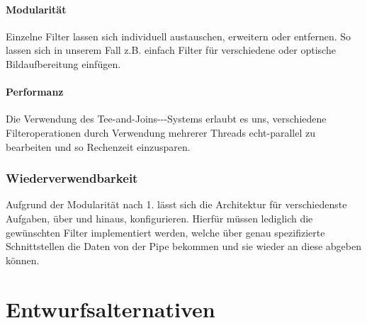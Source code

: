 \documentclass[12pt,a4paper,ngerman,enabledeprecatedfontcommands]{scrreprt}
\begin{document}
\subsubsection{Modularität}
Einzelne \gls{Filter} lassen sich individuell austauschen, erweitern oder entfernen. So lassen sich in unserem Fall z.B. einfach \gls{Filter} für verschiedene  oder optische Bildaufbereitung einfügen.

\subsubsection{Performanz}
Die Verwendung des \glqq{}Tee-and-Joins---Systems\grqq{} erlaubt es 
uns, verschiedene Filteroperationen durch Verwendung mehrerer Threads 
echt-parallel zu bearbeiten und so Rechenzeit einzusparen.\\

\subsection{Wiederverwendbarkeit}
Aufgrund der Modularität nach 1. lässt sich die  Architektur für verschiedenste Aufgaben, über  und  hinaus, konfigurieren. Hierfür müssen lediglich die gewünschten \gls{Filter} implementiert werden, welche über genau spezifizierte Schnittstellen die Daten von der \gls{Pipe} bekommen und sie wieder an diese abgeben können.


\chapter{Entwurfsalternativen}
\end{document}
